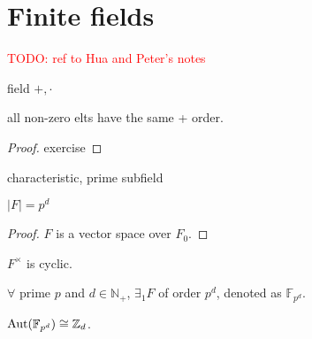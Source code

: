 \documentclass[a4paper,11pt]{article}
\def\maintitle#1{\section*{#1}}
\def\subtitle#1{\section{#1}}
\begin{document}
\else %
    \ifx\chaptitle\undefined %
        \def\maintitle#1{\subsection{#1}}
        \def\subtitle#1{\subsubsection{#1}}
    \else %
        \def\maintitle#1{\section{#1}}
        \def\subtitle#1{\subsection{#1}}
    \fi
\fi

\maintitle{Finite fields}

\textcolor{red}{TODO: ref to Hua and Peter's notes}

\begin{definition}
    field $+,\cdot$
\end{definition}

\begin{lemma}
    all non-zero elts have the same + order.
\end{lemma}
\begin{proof}
    exercise
\end{proof}

\begin{definition}
    characteristic, prime subfield
\end{definition}

\begin{lemma}
    $|F|=p^d$
\end{lemma} 
\begin{proof}
    $F$ is a vector space over $F_0$.
\end{proof}

\begin{lemma}
    $F^\times$ is cyclic.
\end{lemma}

\begin{proposition}
    $\forall$ prime $p$ and $d\in\mathbb{N}_+$, $\exists_1 F$ of order $p^d$, denoted as $\mathbb{F}_{p^d}$. 
\end{proposition}

\begin{lemma}
    $\mathrm{Aut}(\mathbb{F}_{p^d})\cong\mathbb{Z}_d$.
\end{lemma}


\ifx\ChapThreeSecOne\undefined %
     
\end{document}
